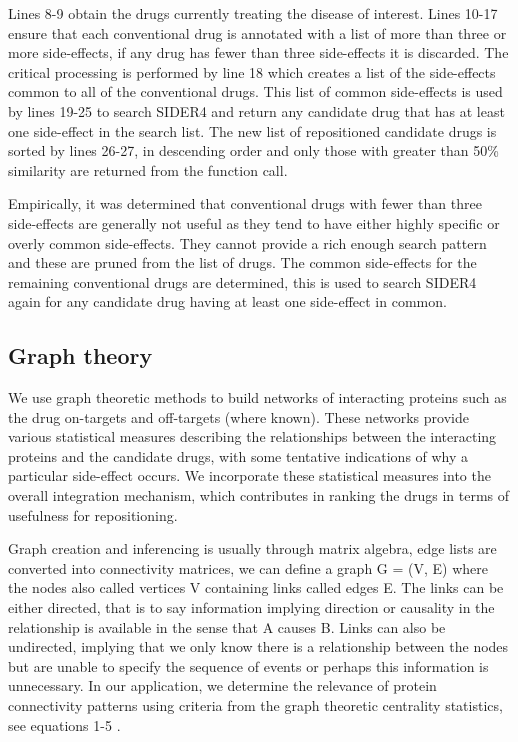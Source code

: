 \documentclass[preprint,11pt]{elsarticle}
\begin{document}
Lines 8-9 obtain the drugs currently treating the disease of interest. Lines 10-17 ensure that each conventional drug is annotated with a list of more than three or more side-effects, if any drug has fewer than three side-effects it is discarded. The critical processing is performed by line 18 which creates a list of the side-effects common to all of the  conventional drugs. This list of common side-effects is used by lines 19-25 to search SIDER4 and return any candidate drug that has at least one side-effect in the search list. The new list of repositioned candidate drugs is sorted by lines 26-27, in descending order and only those with greater than 50\% similarity are returned from the function call.

Empirically, it was determined that conventional drugs with fewer than three side-effects are generally not useful as they tend to have either highly specific or overly common side-effects. They cannot provide a rich enough search pattern and these are pruned from the list of drugs. The common side-effects for the remaining conventional drugs are determined, this is used to search SIDER4 again for any candidate drug having at least one side-effect in common. 


\subsection{Graph theory}
We use graph theoretic methods to build networks of interacting proteins such as the drug on-targets and off-targets (where known). These networks provide various statistical measures describing the relationships between the interacting proteins and the candidate drugs, with some tentative indications of why a particular side-effect occurs.  We incorporate these statistical measures into the overall integration mechanism, which contributes in ranking the drugs in terms of usefulness for repositioning. 

Graph creation and inferencing is usually through matrix algebra, edge lists are converted into connectivity matrices, we can define a graph G = (V, E) where the nodes also called vertices V containing links called edges E. The links can be either directed, that is to say information implying direction or causality in the relationship is available in the sense that A causes B. Links can also be undirected, implying that we only know there is a relationship between the nodes but are unable to specify the sequence of events or perhaps this information is unnecessary. In our application, we determine the relevance of protein connectivity patterns using criteria from the graph theoretic centrality statistics, see equations 1-5 \cite{Freeman1979, Barabasi2004}.
\end{document}
